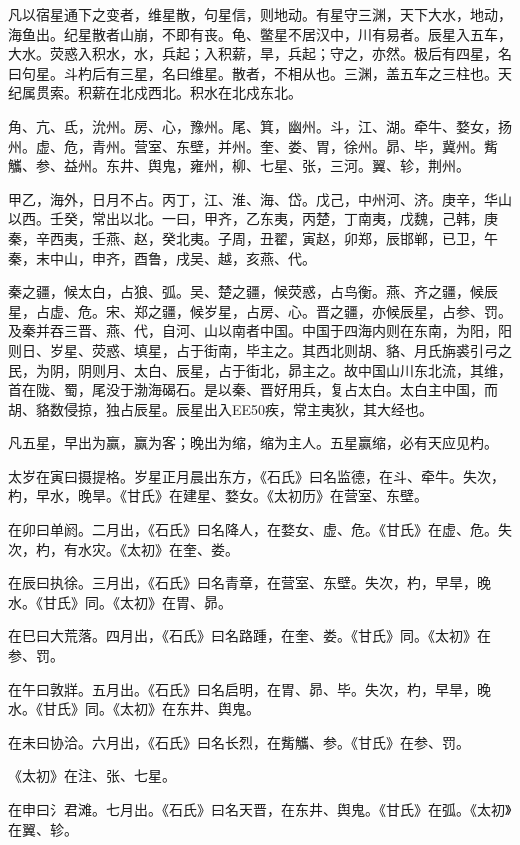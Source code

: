 \documentclass[]{article}
\begin{document}
凡以宿星通下之变者，维星散，句星信，则地动。有星守三渊，天下大水，地动，海鱼出。纪星散者山崩，不即有丧。龟、鳖星不居汉中，川有易者。辰星入五车，大水。荧惑入积水，水，兵起；入积薪，旱，兵起；守之，亦然。极后有四星，名曰句星。斗杓后有三星，名曰维星。散者，不相从也。三渊，盖五车之三柱也。天纪属贯索。积薪在北戍西北。积水在北戍东北。

角、亢、氐，沇州。房、心，豫州。尾、箕，幽州。斗，江、湖。牵牛、婺女，扬州。虚、危，青州。营室、东壁，并州。奎、娄、胃，徐州。昴、毕，冀州。觜觿、参、益州。东井、舆鬼，雍州，柳、七星、张，三河。翼、轸，荆州。

甲乙，海外，日月不占。丙丁，江、淮、海、岱。戊己，中州河、济。庚辛，华山以西。壬癸，常出以北。一曰，甲齐，乙东夷，丙楚，丁南夷，戊魏，己韩，庚秦，辛西夷，壬燕、赵，癸北夷。子周，丑翟，寅赵，卯郑，辰邯郸，已卫，午秦，末中山，申齐，酉鲁，戌吴、越，亥燕、代。

秦之疆，候太白，占狼、弧。吴、楚之疆，候荧惑，占鸟衡。燕、齐之疆，候辰星，占虚、危。宋、郑之疆，候岁星，占房、心。晋之疆，亦候辰星，占参、罚。及秦并吞三晋、燕、代，自河、山以南者中国。中国于四海内则在东南，为阳，阳则日、岁星、荧惑、填星，占于街南，毕主之。其西北则胡、貉、月氏旃裘引弓之民，为阴，阴则月、太白、辰星，占于街北，昴主之。故中国山川东北流，其维，首在陇、蜀，尾没于渤海碣石。是以秦、晋好用兵，复占太白。太白主中国，而胡、貉数侵掠，独占辰星。辰星出入EE50疾，常主夷狄，其大经也。

凡五星，早出为赢，赢为客；晚出为缩，缩为主人。五星赢缩，必有天应见杓。

太岁在寅曰摄提格。岁星正月晨出东方，《石氏》曰名监德，在斗、牵牛。失次，杓，早水，晚旱。《甘氏》在建星、婺女。《太初历》在营室、东壁。

在卯曰单阏。二月出，《石氏》曰名降人，在婺女、虚、危。《甘氏》在虚、危。失次，杓，有水灾。《太初》在奎、娄。

在辰曰执徐。三月出，《石氏》曰名青章，在营室、东壁。失次，杓，早旱，晚水。《甘氏》同。《太初》在胃、昴。

在巳曰大荒落。四月出，《石氏》曰名路踵，在奎、娄。《甘氏》同。《太初》在参、罚。

在午曰敦牂。五月出。《石氏》曰名启明，在胃、昴、毕。失次，杓，早旱，晚水。《甘氏》同。《太初》在东井、舆鬼。

在未曰协洽。六月出，《石氏》曰名长烈，在觜觿、参。《甘氏》在参、罚。

《太初》在注、张、七星。

在申曰氵君滩。七月出。《石氏》曰名天晋，在东井、舆鬼。《甘氏》在弧。《太初》在翼、轸。
\end{document}
